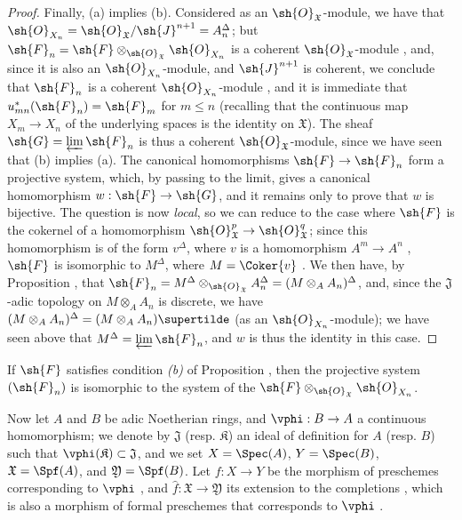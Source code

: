 \begin{proof}
Finally, (a) implies (b).
Considered as an $\sh{O}_\mathfrak{X}$-module, we have that $\sh{O}_{X_n}=\sh{O}_\mathfrak{X}/\sh{J}^{n+1}=A_n^\Delta$; but $\sh{F}_n=\sh{F}\otimes_{\sh{O}_\mathfrak{X}}\sh{O}_{X_n}$ is a coherent $\sh{O}_\mathfrak{X}$-module , and, since it is also an $\sh{O}_{X_n}$-module, and $\sh{J}^{n+1}$ is coherent, we conclude that $\sh{F}_n$ is a coherent $\sh{O}_{X_n}$-module , and it is immediate that $u_{mn}^*(\sh{F}_n)=\sh{F}_m$ for $m\leq n$ (recalling that the continuous map $X_m\to X_n$ of the underlying spaces is the identity on $\mathfrak{X}$).
The sheaf $\sh{G}=\varprojlim\sh{F}_n$ is thus a coherent $\sh{O}_\mathfrak{X}$-module, since we have seen that (b) implies (a). The canonical homomorphisms $\sh{F}\to\sh{F}_n$ form a projective system, which, by passing to the limit, gives a canonical homomorphism $w:\sh{F}\to\sh{G}$, and it remains only to prove that $w$ is bijective.
The question is now \emph{local}, so we can reduce to the case where $\sh{F}$ is the cokernel of a homomorphism $\sh{O}_\mathfrak{X}^p\to\sh{O}_\mathfrak{X}^q$; since this homomorphism is of the form $v^\Delta$, where $v$ is a homomorphism $A^m\to A^n$ , $\sh{F}$ is isomorphic to $M^\Delta$, where $M=\Coker{v}$ .
We then have, by Proposition , that $\sh{F}_n=M^\Delta\otimes_{\sh{O}_\mathfrak{X}}A_n^\Delta=(M\otimes_A A_n)^\Delta$, and, since the $\mathfrak{J}$-adic topology on $M\otimes_A A_n$ is discrete, we have $(M\otimes_A A_n)^\Delta=(M\otimes_A A_n)\supertilde$ (as an $\sh{O}_{X_n}$-module); we have seen above that $M^\Delta=\varprojlim\sh{F}_n$, and $w$ is thus the identity in this case.
\end{proof}

\begin{corollary}[10.10.6]
\label{I.10.10.6}
If $\sh{F}$ satisfies condition \emph{(b)} of Proposition , then the projective system $(\sh{F}_n)$ is isomorphic to the system of the $\sh{F}\otimes_{\sh{O}_\mathfrak{X}}\sh{O}_{X_n}$.
\end{corollary}

\begin{env}[10.10.7]
\label{I.10.10.7}
Now let $A$ and $B$ be adic Noetherian rings, and $\vphi:B\to A$ a continuous homomorphism; we denote by $\mathfrak{J}$ (resp. $\mathfrak{K}$) an ideal of definition for $A$ (resp. $B$) such that $\vphi(\mathfrak{K})\subset\mathfrak{J}$, and we set $X=\Spec(A)$, $Y=\Spec(B)$, $\mathfrak{X}=\Spf(A)$, and $\mathfrak{Y}=\Spf(B)$.
Let $f:X\to Y$ be the morphism of preschemes corresponding to $\vphi$ , and $\widehat{f}:\mathfrak{X}\to\mathfrak{Y}$ its extension to the completions , which is also a morphism of formal preschemes that corresponds to $\vphi$ .
\end{env}

